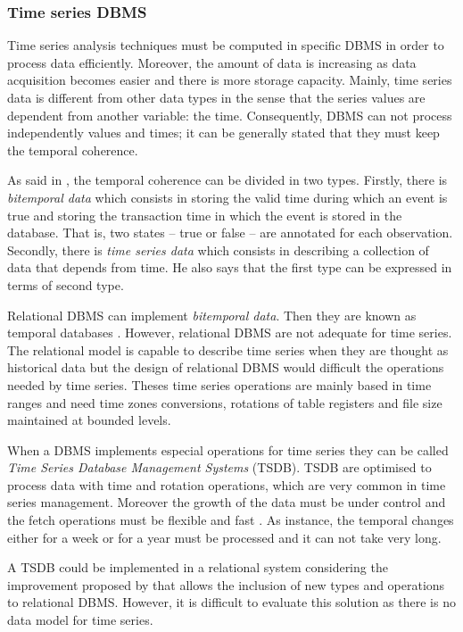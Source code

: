 
\subsubsection{Time series DBMS}

Time series analysis techniques must be computed in specific DBMS in order to process data efficiently. Moreover, the amount of data is increasing as data acquisition becomes easier and there is more storage capacity. 
Mainly, time series data is different from other data types in the sense that the series values are dependent from another variable: the time. Consequently, DBMS can not process independently values and times; it can be generally stated that they must keep the temporal coherence. 


As said in \textcite{assfalg08:thesis}, the temporal coherence can be divided in two types. Firstly, there is  \emph{bitemporal data} which consists in storing the valid time during which an event is true and storing the transaction time in which the event is stored in the database. That is, two states -- true or false -- are annotated for each observation.  Secondly, there is \emph{time series data} which consists in describing a collection of data that depends from time. He also says that the first type can be expressed in terms of second type.

Relational DBMS can implement \emph{bitemporal data}. Then they are known as temporal databases \parencite[ch.\ 22]{date}. However, relational DBMS are not adequate for time series. The relational model is capable to describe time series when they are thought as historical data but the design of relational DBMS would difficult the operations  needed by time series. Theses time series operations are mainly based in time ranges and need time zones conversions, rotations of table registers and file size maintained at bounded levels.

When a DBMS implements especial operations for time series they can be called \emph{Time Series Database Management Systems} (TSDB). TSDB are optimised to process data with time and rotation operations, which are very common in time series management. Moreover the growth of the data must be under control and the fetch operations must be flexible and fast \parencite{keogh10:isax}. As instance, the temporal changes either for a week or for a year must be processed and it can not take very long.

A TSDB could be implemented in a relational system considering the improvement proposed by \textcite{stonebraker86} that allows the inclusion of new types and operations to relational DBMS. However, it is difficult to evaluate this solution as there is no data model  for time series. 


